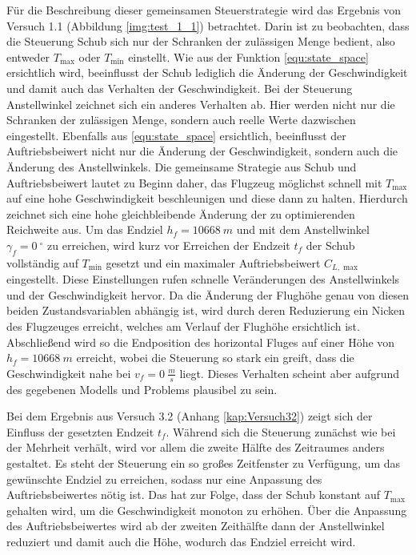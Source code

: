 Für die Beschreibung dieser gemeinsamen Steuerstrategie wird das Ergebnis von Versuch 1.1 (Abbildung \ref{img:test_1_1}) betrachtet. Darin ist zu beobachten, dass die Steuerung Schub sich nur der Schranken der zulässigen Menge bedient, also entweder $T_{\max}$ oder $T_{\min}$ einstellt. Wie aus der Funktion \ref{equ:state_space} ersichtlich wird, beeinflusst der Schub lediglich die Änderung der Geschwindigkeit und damit auch das Verhalten der Geschwindigkeit. Bei der Steuerung Anstellwinkel zeichnet sich ein anderes Verhalten ab. Hier werden nicht nur die Schranken der zulässigen Menge, sondern auch reelle Werte dazwischen eingestellt. Ebenfalls aus \ref{equ:state_space} ersichtlich, beeinflusst der Auftriebsbeiwert nicht nur die Änderung der Geschwindigkeit, sondern auch die Änderung des Anstellwinkels. Die gemeinsame Strategie aus Schub und Auftriebsbeiwert lautet zu Beginn daher, das Flugzeug möglichst schnell mit $T_{\max}$ auf eine hohe Geschwindigkeit beschleunigen und diese dann zu halten. Hierdurch zeichnet sich eine hohe gleichbleibende Änderung der zu optimierenden Reichweite aus. Um das Endziel $h_f = 10668 \ m$ und mit dem Anstellwinkel $\gamma_f = 0 \ ^\circ$ zu erreichen, wird kurz vor Erreichen der Endzeit $t_f$ der Schub vollständig auf $T_{\min}$ gesetzt und ein maximaler Auftriebsbeiwert $C_{L, \max}$ eingestellt. Diese Einstellungen rufen schnelle Veränderungen des Anstellwinkels und der Geschwindigkeit hervor. Da die Änderung der Flughöhe genau von diesen beiden Zustandsvariablen abhängig ist, wird durch deren Reduzierung ein Nicken des Flugzeuges erreicht, welches am Verlauf der Flughöhe ersichtlich ist. Abschließend wird so die Endposition des horizontal Fluges auf einer Höhe von $h_f = 10668 \ m$ erreicht, wobei die Steuerung so stark ein greift, dass die Geschwindigkeit nahe bei $v_f = 0 \ \frac{m}{s}$ liegt. Dieses Verhalten scheint aber aufgrund des gegebenen Modells und Problems plausibel zu sein.

Bei dem Ergebnis aus Versuch 3.2 (Anhang \ref{kap:Versuch32}) zeigt sich der Einfluss der gesetzten Endzeit $t_f$. Während sich die Steuerung zunächst wie bei der Mehrheit verhält, wird vor allem die zweite Hälfte des Zeitraumes anders gestaltet. Es steht der Steuerung ein so großes Zeitfenster zu Verfügung, um das gewünschte Endziel zu erreichen, sodass nur eine Anpassung des Auftriebsbeiwertes nötig ist. Das hat zur Folge, dass der Schub konstant auf $T_{\max}$ gehalten wird, um die Geschwindigkeit monoton zu erhöhen. Über die Anpassung des Auftriebsbeiwertes wird ab der zweiten Zeithälfte dann der Anstellwinkel reduziert und damit auch die Höhe, wodurch das Endziel erreicht wird.

